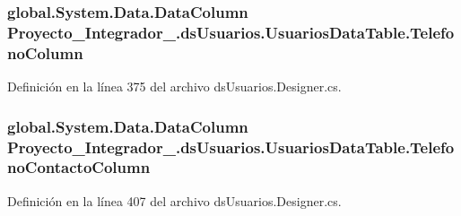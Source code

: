 \hypertarget{class_proyecto___integrador__3_1_1ds_usuarios_1_1_usuarios_data_table_ac740a752802c6cb9a3ed8f4c1990f750}{
\subsubsection[{Telefono\-Column}]{\setlength{\rightskip}{0pt plus 5cm}global.\-System.\-Data.\-Data\-Column Proyecto\-\_\-\-Integrador\-\_.\-ds\-Usuarios.\-Usuarios\-Data\-Table.\-Telefono\-Column\hspace{0.3cm}{\ttfamily [get]}}}\label{class_proyecto___integrador__3_1_1ds_usuarios_1_1_usuarios_data_table_ac740a752802c6cb9a3ed8f4c1990f750}


Definición en la línea 375 del archivo ds\-Usuarios.\-Designer.\-cs.

\hypertarget{class_proyecto___integrador__3_1_1ds_usuarios_1_1_usuarios_data_table_aab76d3089d1ea9ee22016e085deace10}{
\subsubsection[{Telefono\-Contacto\-Column}]{\setlength{\rightskip}{0pt plus 5cm}global.\-System.\-Data.\-Data\-Column Proyecto\-\_\-\-Integrador\-\_.\-ds\-Usuarios.\-Usuarios\-Data\-Table.\-Telefono\-Contacto\-Column\hspace{0.3cm}{\ttfamily [get]}}}\label{class_proyecto___integrador__3_1_1ds_usuarios_1_1_usuarios_data_table_aab76d3089d1ea9ee22016e085deace10}


Definición en la línea 407 del archivo ds\-Usuarios.\-Designer.\-cs.

